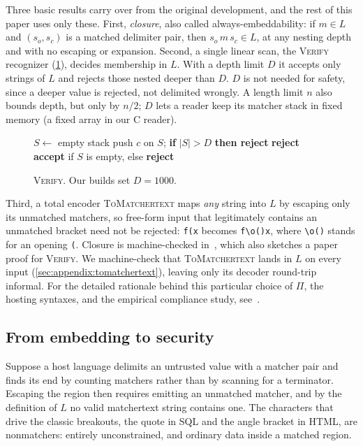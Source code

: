 Three basic results carry over from the original development,
and the rest of this paper uses only these.
First, \emph{closure}, also called always-embeddability: if $m\in L$ and
$(s_o,s_c)$ is a matched delimiter pair, then $s_o\,m\,s_c\in L$, at any nesting
depth and with no escaping or expansion.
Second, a single linear scan, the \textsc{Verify} recognizer
(\cref{fig:verify}), decides membership in $L$. With a depth limit $D$ it
accepts only strings of $L$ and rejects those nested deeper than $D$.
$D$ is not needed for safety, since a deeper value is rejected, not delimited
wrongly. A length limit $n$ also bounds depth, but only by $n/2$; $D$ lets a reader
keep its matcher stack in fixed memory (a fixed array in our C reader).
\begin{figure}[t]
\small
\begin{algorithmic}
  \State $S \gets$ empty stack
      \State push $c$ on $S$; \textbf{if} $|S| > D$ \textbf{then reject}
        \textbf{reject}
      \EndIf
    \EndIf
  \EndFor
  \State \textbf{accept} if $S$ is empty, else \textbf{reject}
\EndFunction
\end{algorithmic}
\caption{\textsc{Verify}. Our builds set $D=1000$.}
\label{fig:verify}
\end{figure}
Third, a total encoder \textsc{ToMatchertext} maps \emph{any} string into $L$ by
escaping only its unmatched matchers, so free-form input that legitimately
contains an unmatched bracket need not be rejected: \verb|f(x| becomes
\verb|f\o()x|, where \verb|\o()| stands for an opening \verb|(|.
Closure is machine-checked in~\cite{matchertext}, which also sketches a paper
proof for \textsc{Verify}. We machine-check that \textsc{ToMatchertext} lands in
$L$ on every input (\cref{sec:appendix:tomatchertext}), leaving only its decoder
round-trip informal.
For the detailed rationale behind this particular choice of $\Pi$,
the hosting syntaxes, and the empirical
compliance study, see~\cite{matchertext}.

\subsection{From embedding to security}
\label{sec:relevance:security}

Suppose a host language delimits an
untrusted value with a matcher pair and finds its end by counting matchers
rather than by scanning for a terminator. Escaping the region then requires
emitting an unmatched matcher, and by the definition of $L$ no valid matchertext
string contains one.
The characters that drive the classic breakouts, the quote in SQL and the angle
bracket in HTML, are nonmatchers: entirely unconstrained, and ordinary data
inside a matched region.

